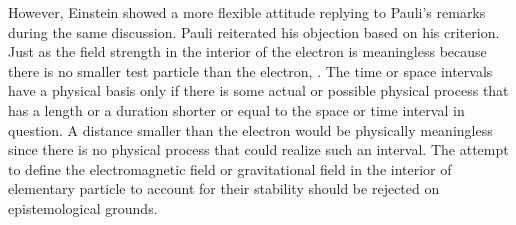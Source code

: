 \documentclass[draft]{article}
\begin{document}
However, Einstein showed a more flexible attitude replying to Pauli's remarks during the same discussion. Pauli reiterated his objection based on his  criterion. Just as the field strength in the interior of the electron is meaningless because there is no smaller test particle than the electron,  \citep[650]{Einstein1920c}. The time or space intervals have a physical basis only if there is some actual or possible physical process that has a length or a duration shorter or equal to the space or time interval in question. A distance smaller than the electron would be physically meaningless since there is no physical process that could realize such an interval. The attempt to define the electromagnetic field or gravitational field in the interior of elementary particle to account for their stability should be rejected on epistemological grounds.
\end{document}
